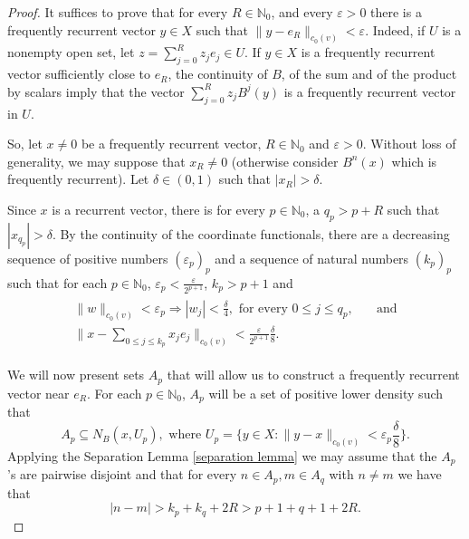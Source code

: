 \documentclass[11pt]{amsart}
\newcommand{\sub}{\subseteq}
\begin{document}
\begin{proof}
It suffices to prove that for every $R\in\mathbb N_0$, and every $\varepsilon>0$ there is a frequently recurrent vector $y\in X$ such that $\|y-e_R\|_{c_0(v)}<\varepsilon$. Indeed, if $U$ is a nonempty open set, let $z=\sum_{j=0}^R z_je_j\in U$. 
If $y\in X$ is a frequently recurrent vector sufficiently close to $e_R$, the continuity of $B$, of the sum and of the product by scalars imply that the vector $\sum_{j=0}^R z_j B^j(y)$ is a frequently recurrent vector in $U$.

So,  let $x\neq 0$ be a frequently recurrent vector,  $R\in\mathbb N_0$ and $\varepsilon>0$. Without loss of generality, we may suppose that $x_R\neq 0$ (otherwise consider $B^n(x)$ which is frequently recurrent). Let $\delta\in(0,1)$ such that $|x_R|>\delta.$


Since $x$ is a recurrent vector,  there is for every $p\in\mathbb N_0$, a  $q_p>p+R$ such that $|x_{q_p}|>\delta$. By the continuity of the coordinate functionals, there are a decreasing sequence of positive numbers $(\varepsilon_p)_p$ and a sequence of natural numbers $(k_p)_p$ such that for each $p\in\mathbb N_0$, $\varepsilon_{p}<\frac{\varepsilon}{2^{p+1}}$,  $k_p>p+1$ and
\begin{align}\label{eq: beta_p (zero one freq) UNIL c_0}
 \begin{split}
  \|w\|_{c_0(v)}<\varepsilon_{p}\Longrightarrow  |w_{j}|<\frac{\delta}{4} ,  \text{ for every } 0\leq j\leq q_p, &\quad \text{and}\\
 \|x-\sum_{0\leq j\le k_p} x_j e_j\|_{{c_0(v)}}<\frac{\varepsilon}{2^{p+1}}\frac{\delta}{8}.&
 \end{split}
 \end{align}

We will now present sets $A_p$  that will allow us to construct a frequently recurrent vector near $e_R$. For each $p\in\mathbb N_0$, $A_p$ will be a set of positive lower  density such that  
\begin{equation}\label{eq: A_p zero one freq c_0}
A_p\sub N_B(x,U_p), \text{ where } U_p=\{y\in X:\|y-x\|_{c_0(v)}<\varepsilon_p\frac{\delta}{8}\}.
\end{equation}
Applying the Separation Lemma \ref{separation lemma}
we may assume that the $A_p$'s are pairwise disjoint and that for every $n\in A_p,m\in A_q$ with $n\neq m$ we have that
\begin{equation}\label{eq separation zero one freq c_0}
|n-m|>k_p+k_q+2R>p+1+q+1+2R.    
\end{equation}


\end{proof}
\end{document}
